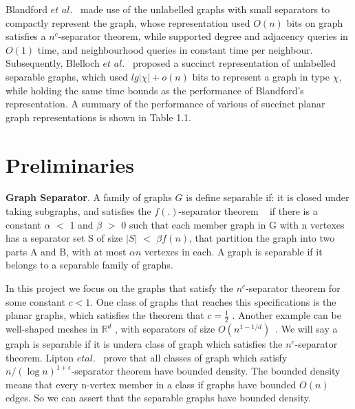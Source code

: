 \documentclass[12pt,glossary]{dalthesis}
\begin{document}
\bigskip

Blandford $et$ $al.$~\cite{compact-representation} made use of the unlabelled graphs with small separators to compactly represent the graph, whose representation used $O(n)$ bits on graph satisfies a $n^{c}$-separator theorem, while supported degree and adjacency queries in $O(1)$ time, and neighbourhood queries in constant time per neighbour. Subsequently, Blelloch $et$ $al.$~\cite{succinct-representation} proposed a succinct representation of unlabelled separable graphs, which used $lg| \chi |+ o(n)$ bits to represent a graph in type $\chi$, while holding the same time bounds as the performance of Blandford's representation. A summary of the performance of various of succinct planar graph representations is shown in Table 1.1.
        




\section{Preliminaries}

\textbf{Graph Separator}. A family of graphs $G$ is define separable if: it is closed under taking subgraphs, and satisfies the $f(.)$-separator theorem ~\cite{separator-theorem} if there is a constant $\alpha$ $<$ 1 and $\beta$ $>$ 0 such that each member graph in G with n vertexes has a separator set S of size $|S|$ $<$ $\beta f(n)$, that partition the graph into two parts A and B, with at most $\alpha n$ vertexes in each. A graph is separable if it belongs to a separable family of graphs. 

\bigskip
\bigskip

In this project we focus on the graphs that satisfy the $n^{c}$-separator theorem for some constant $c < 1$. One class of graphs that reaches this specifications is the planar graphs, which satisfies the theorem that $c = \frac{1}{2}$ . Another example can be well-shaped meshes in $\mathbb{R}^{d}$ , with separators of size $O(n^{1-1/d})$~\cite{ separators-sphere-packing}. We will say a graph is separable if it is undera class of graph which satisfies the $n^{c}$-separator theorem. Lipton $et al$.~\cite{Nested-Dissection} prove that all classes of graph which satisfy $n/(\log n )^{1+\epsilon}$-separator theorem have bounded density. The bounded density means that every n-vertex member in a class if graphs have bounded $O(n)$ edges. So we can assert that the separable graphs have bounded density.

\bigskip
\bigskip
\end{document}
